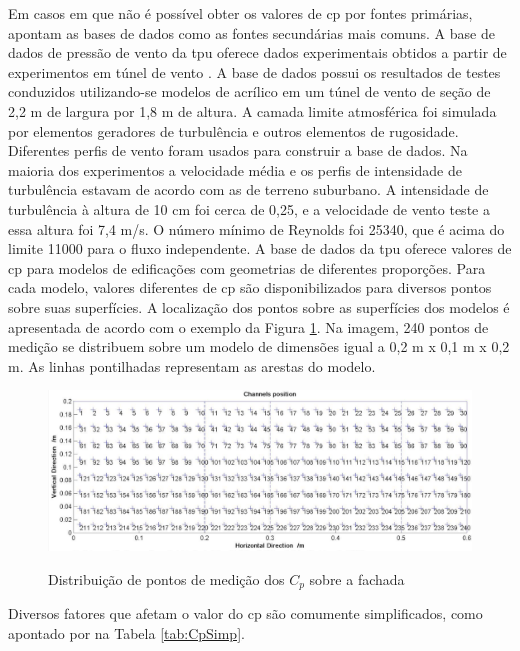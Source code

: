 Em casos em que não é possível obter os valores de \acrshort{cp} por fontes primárias,  apontam as bases de dados como as fontes secundárias mais comuns.
A base de dados de pressão de vento da \acrfull{tpu} oferece dados experimentais obtidos a partir de experimentos em túnel de vento \cite{TPU2018}.
A base de dados possui os resultados de testes conduzidos utilizando-se modelos de acrílico em um túnel de vento de seção de 2,2 m de largura por 1,8 m de altura.
A camada limite atmosférica foi simulada por elementos geradores de turbulência e outros elementos de rugosidade. Diferentes perfis de vento foram usados para construir a base de dados. Na maioria dos experimentos a velocidade média e os perfis de intensidade de turbulência estavam de acordo com as de terreno suburbano. A intensidade de turbulência à altura de 10 cm foi cerca de 0,25, e a velocidade de vento teste a essa altura foi 7,4 m/s. O número mínimo de Reynolds foi 25340, que é acima do limite 11000 para o fluxo independente.
A base de dados da \acrshort{tpu} oferece valores de \acrshort{cp} para modelos de edificações com geometrias de diferentes proporções. Para cada modelo, valores diferentes de \acrshort{cp} são disponibilizados para diversos pontos sobre suas superfícies. 
A localização dos pontos sobre as superfícies dos modelos é apresentada de acordo com o exemplo da Figura \ref{fig:TPU_points}. Na imagem, 240 pontos de medição se distribuem sobre um modelo de dimensões igual a 0,2 m x 0,1 m x 0,2 m. As linhas pontilhadas representam as arestas do modelo.


\begin{figure}[h]
	\centering
	\caption{Distribuição de pontos de medição dos $C_p$ sobre a fachada}
	\includegraphics[width=1\linewidth]{img/tpu_points.png}
	\label{fig:TPU_points}
\end{figure}

Diversos fatores que afetam o valor do \acrshort{cp} são comumente simplificados, como apontado por  na Tabela \ref{tab:CpSimp}.

